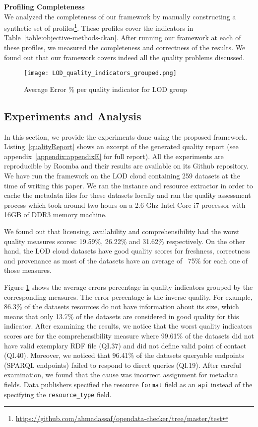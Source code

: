 \textbf{Profiling Completeness}\\

We analyzed the completeness of our framework by manually constructing a synthetic set of profiles\footnote{\url{https://github.com/ahmadassaf/opendata-checker/tree/master/test}}. These profiles cover the indicators in Table~\ref{table:objective-methods-ckan}. After running our framework at each of these profiles, we measured the completeness and correctness of the results. We found out that our framework covers indeed all the quality problems discussed.

\begin{figure}[ht]
  \centering
    \texttt{[image: LOD\_quality\_indicators\_grouped.png]}
  \caption{Average Error \% per quality indicator for LOD group}
  \label{fig:average-error-lod-group}
\end{figure}

\subsection{Experiments and Analysis}

In this section, we provide the experiments done using the proposed framework. Listing~\ref{qualityReport} shows an excerpt of the generated quality report (see appendix~\ref{appendix:appendixE} for full report). All the experiments are reproducible by Roomba and their results are available on its Github repository. We have run the framework on the LOD cloud containing 259 datasets at the time of writing this paper. We ran the instance and resource extractor in order to cache the metadata files for these datasets locally and ran the quality assessment process which took around two hours on a 2.6 Ghz Intel Core i7 processor with 16GB of DDR3 memory machine.

We found out that licensing, availability and comprehensibility had the worst quality measures scores: 19.59\%, 26.22\% and 31.62\% respectively. On the other hand, the LOD cloud datasets have good quality scores for freshness, correctness and provenance as most of the datasets have an average of ~75\% for each one of those measures.

Figure \ref{fig:average-error-lod-group} shows the average errors percentage in quality indicators grouped by the corresponding measures. The error percentage is the inverse quality. For example, 86.3\% of the datasets resources do not have information about its size, which means that only 13.7\% of the datasets are considered in good quality for this indicator. After examining the results, we notice that the worst quality indicators scores are for the comprehensibility measure where 99.61\% of the datasets did not have valid exemplary RDF file (QI.37) and did not define valid point of contact (QI.40). Moreover, we noticed that 96.41\% of the datasets queryable endpoints (SPARQL endpoints) failed to respond to direct queries (QI.19). After careful examination, we found that the cause was incorrect assignment for metadata fields. Data publishers specified the resource \texttt{format} field as an \texttt{api} instead of the specifying the \texttt{resource\_type} field.

